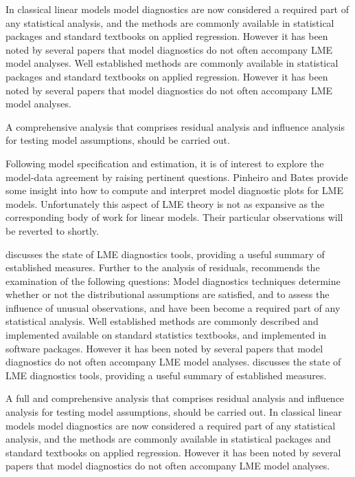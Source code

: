 \documentclass[12pt, a4paper]{report}
\theoremstyle{plain}
\theoremstyle{definition}
\theoremstyle{remark}
\begin{document}
 In classical linear models model diagnostics are now considered a required part of any statistical analysis, and the methods are commonly available in statistical packages and standard textbooks on applied regression. However it has been noted by several papers \citep{Christensen, schabenberger} that model diagnostics do not often accompany LME model analyses. Well established methods are commonly available in statistical packages and standard textbooks on applied regression. However it has been noted by several papers that model diagnostics do not often accompany LME model analyses. 

A comprehensive analysis that comprises residual analysis and influence analysis for testing model assumptions, should be carried out. 
	
	Following model specification and estimation, it is of interest to explore the model-data
	agreement by raising pertinent questions. Pinheiro and Bates provide some insight into how to compute and interpret model diagnostic plots for LME models. Unfortunately this aspect of LME theory is not as expansive as the corresponding body of work for linear models. Their particular observations will be reverted to shortly. 
	
\citet{schabenberger} discusses the state of LME diagnostics tools, providing a useful summary of established measures. Further to the analysis of residuals, \citet{schabenberger} recommends the examination of the following questions:
\newpage
Model diagnostics techniques determine whether or not the distributional assumptions are satisfied, and to assess the influence of unusual observations, and have been become a required part of any statistical analysis. Well established methods are commonly described and implemented available on standard statistics textbooks, and implemented in software packages. However it has been noted by several papers that model diagnostics do not often accompany LME model analyses. \citet{schabenberger} discusses the state of LME diagnostics tools, providing a useful summary of established measures.
	
	A full and comprehensive
	analysis that comprises residual analysis and influence analysis for testing model assumptions, should be carried out.  In classical linear models model diagnostics are now considered a required part of any statistical analysis, and the methods are commonly available in statistical packages and standard textbooks on applied regression. However it has been noted by several papers \citep{Christensen, schabenberger} that model diagnostics do not often accompany LME model analyses.
	
\end{document}
